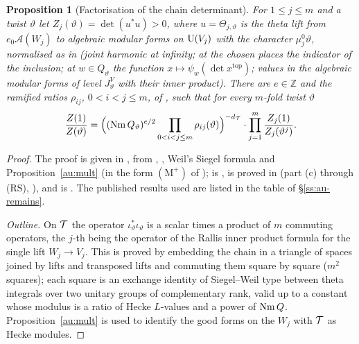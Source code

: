 \documentclass[10pt]{amsart}
\newtheorem{proposition}[theorem]{Proposition}
\theoremstyle{definition}
\theoremstyle{remark}
\newcommand{\Z}{\mathbb Z}
\begin{document}
\begin{proposition}[Factorisation of the chain determinant]\label{au:factor}
For $1\le j\le m$ and a twist $\vartheta$ let $Z_j(\vartheta)=\det(u^*u)>0$, where
$u=\Theta_{j,\vartheta}$ is the theta lift from $e_0\mathcal A(W_j)$ to algebraic modular forms on
$\mathrm U(V_j)$ with the character $\mu_j^0\vartheta$, normalised as in {\cite[\S2.4]{P53}} (joint
harmonic at infinity; at the chosen places the indicator of the inclusion; at $w\in Q_\vartheta$
the function $x\mapsto\psi_w(\det x^{\mathrm{top}})$; values in the algebraic modular forms of level
$J^V_\vartheta$ with their inner product). There are $e\in\Z$ and the ramified ratios $\rho_{ij}$,
$0<i<j\le m$, of {\cite[(9)]{P53}}, such that
for every $m$-fold twist $\vartheta$
\[
\frac{Z(1)}{Z(\vartheta)}=\Bigl((\operatorname{Nm} Q_\vartheta)^{e/2}\prod_{0<i<j\le m}\rho_{ij}(\vartheta)
\Bigr)^{-d_{\mathcal T}}\cdot\prod_{j=1}^m\frac{Z_j(1)}{Z_j(\vartheta^j)} .
\]
\end{proposition}
\begin{proof}
The proof is given in {\cite[\S2.5]{P53}}, from {\cite[Lemma~2.10]{P53}}, {\cite[Theorem~2.21]{P53}}, Weil's Siegel formula and Proposition~\ref{au:mult} (in the form $(\mathrm M^+)$ of {\cite[Lemma~2.20]{P53}}); {\cite[Lemma~2.10]{P53}} is {\cite[Proposition~4.46]{P53}}, {\cite[Theorem~2.21]{P53}} is proved in {\cite[\S\S4.1--4.4]{P53}} (part (c) through (RS), {\cite[Theorem~4.62]{P53}}), and {\cite[Theorem~2.27]{P53}} is {\cite[Theorem~3.2]{P53}}. The published results used are listed in the table of \S\ref{ss:au-remains}.

\emph{Outline.} On $\mathcal T$
the operator $\iota_\vartheta^*\iota_\vartheta$ is a scalar times a product of $m$ commuting
operators, the $j$-th being the operator of the Rallis inner product formula for the single lift
$W_j\to V_j$. This is proved by embedding the chain in a triangle of spaces joined by lifts and
transposed lifts and commuting them square by square ($m^2$ squares); each square is an exchange
identity of Siegel--Weil type between theta integrals over two unitary groups of complementary
rank, valid up to a constant whose modulus is a ratio of Hecke $L$-values and a power of
$\operatorname{Nm} Q$. Proposition~\ref{au:mult} is used to identify the good forms on the $W_j$ with $\mathcal T$
as Hecke modules.
\end{proof}
\end{document}
